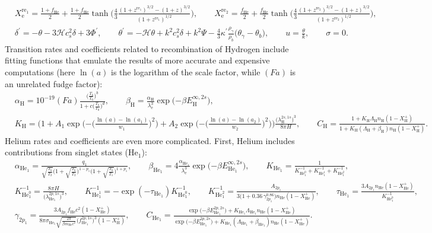 \documentclass{aa}
\newcommand\scrH{\mathscr{H}}
\newcommand\el{\mathrm{e}} %
\newcommand\Hy{\mathrm{H}} %
\newcommand\He{\mathrm{He}} %
\newcommand\Hesin{{\mathrm{He}_1}} %
\newcommand\reone{{\mathrm{re}_1}} %
\newcommand\retwo{{\mathrm{re}_2}} %
\begin{document}
\begin{align*}
&
{X_\el^\reone} = \frac{1 + f_\He}{2} + \frac{ 1 + f_\He }{2} \tanh\bigg( \frac43 \frac{( 1 + z^\reone )^{3/2} - ( 1 + z )^{3/2}}{ ( 1 + z^\reone )^{1/2}} \bigg) , \qquad
{X_\el^\retwo} = \frac{f_\He}{2} + \frac{f_\He}{2} \tanh\bigg( \frac43 \frac{( 1 + {z^\retwo} )^{3/2} - ( 1 + z )^{3/2}}{ ( 1 + {z^\retwo} )^{1/2}} \bigg) , \\
&
\delta^\prime = - \theta - 3 \scrH c_s^2 \delta + 3 \Phi^\prime , \qquad
\theta^\prime = - \scrH \theta + k^{2} {c_s^2} \delta + k^{2} \Psi - \frac43 \kappa^\prime \frac{\rho_\gamma}{\rho_b} \big(\theta_\gamma-\theta_b\big) , \qquad %
u = \frac{\theta}{k} , \qquad
\sigma = 0 .
\end{align*}
Transition rates and coefficients related to recombination of Hydrogen include fitting functions that emulate the results of more accurate and expensive computations (here $\ln(a)$ is the logarithm of the scale factor, while $(Fa)$ is an unrelated fudge factor):
\begin{align*}
&
\alpha_\Hy = 10^{-19} (Fa) \frac{\Big( \frac{T_b}{T_0} \Big)^b }{ 1 + c \Big(\frac{T_b}{T_0}\Big)^d }, \qquad
\beta_\Hy = \frac{\alpha_\Hy}{\lambda_\el^3} \exp\big({-\beta E_\Hy^{\infty,2s}}\big), \\
&
K_\Hy = \Bigg( 1 + A_1 \exp\Bigg({-\bigg(\frac{\ln(a)-\ln(a_1)}{w_1}\bigg)^2}\Bigg) + A_2 \exp\Bigg({-\bigg(\frac{\ln(a)-\ln(a_2)}{w_2}\bigg)^2}\Bigg) \Bigg) \frac{\big(\lambda_\Hy^{2s,1s}\big)^3}{8\pi H}, \qquad
C_\Hy = \frac{1 + K_\Hy \Lambda_\Hy n_\Hy (1-X_\Hy^+) }{ 1 + K_\Hy (\Lambda_\Hy+\beta_\Hy) n_\Hy (1-X_\Hy^+) }.
\end{align*}
Helium rates and coefficients are even more complicated. First, Helium includes contributions from singlet states ($\Hesin$):
\begin{align*}
&
\alpha_\Hesin = \frac{q_1 }{ \sqrt{\frac{T_b}{T_2}} \Big(1+\sqrt{\frac{T_b}{T_2}}\Big)^{1-p_1} \Big(1+\sqrt{\frac{T_b}{T_1}}\Big)^{1+p_1} }, \qquad
\beta_\Hesin = 4 \frac{\alpha_\Hesin }{ \lambda_\el^3 } \exp\big({-β E_\Hesin^{\infty,2s}}\big), \qquad
K_\Hesin = \frac{1}{K_{\He_1^0}^{-1} + K_{\He_1^1}^{-1} + K_{\He_1^2}^{-1}}, \\
&
K_{\He_1^0}^{-1} = \frac{8 \pi H }{ \big(\lambda_\Hesin^{2p,1s}\big)^3 }, \qquad
K_{\He_1^1}^{-1} = -\exp(-\tau_\Hesin) K_{\He_1^0}^{-1}, \qquad
K_{\He_1^2}^{-1} = \frac{A_{2p_1} }{ 3 \big(1+0.36 \, \gamma_{2p_1}^{0.86}\big) n_\He (1-X_\He^+) }, \qquad
\tau_\Hesin = \frac{ 3 A_{2p_1} n_\He (1-X_\He^+) }{ K_{\He_1^0}^{-1} }, \\
&
\gamma_{2p_1} = \frac{ 3 A_{2p_1} f_\He c^2 (1-X_\He^+) }{ 8\pi \sigma_{\Hesin} \sqrt{\frac{2 \pi}{\beta m_\He c^2}} \big(f_\Hesin^{2p,1s}\big)^3 (1-X_\Hy^+) }, \qquad
C_\Hesin = \frac{\exp\big({-\beta E_\Hesin^{2p,2s}}\big) + K_\Hesin \Lambda_\Hesin n_\He (1-X_\He^+) }{ \exp\big({-\beta E_\Hesin^{2p,2s}}\big) + K_\Hesin (\Lambda_\Hesin+\beta_\Hesin) n_\He (1-X_\He^+) }.
\end{align*}
\end{document}
